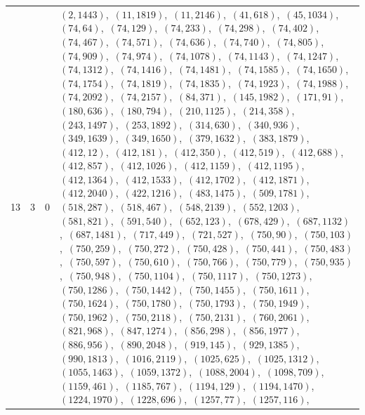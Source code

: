 \documentclass[11pt]{article}
\begin{document}
\begin{longtable}{@{}rrl>{\raggedright\arraybackslash}p{}@{}}
13 & 3 & $0$ & $(2,1443)$,\allowbreak\ $(11,1819)$,\allowbreak\ $(11,2146)$,\allowbreak\ $(41,618)$,\allowbreak\ $(45,1034)$,\allowbreak\ $(74,64)$,\allowbreak\ $(74,129)$,\allowbreak\ $(74,233)$,\allowbreak\ $(74,298)$,\allowbreak\ $(74,402)$,\allowbreak\ $(74,467)$,\allowbreak\ $(74,571)$,\allowbreak\ $(74,636)$,\allowbreak\ $(74,740)$,\allowbreak\ $(74,805)$,\allowbreak\ $(74,909)$,\allowbreak\ $(74,974)$,\allowbreak\ $(74,1078)$,\allowbreak\ $(74,1143)$,\allowbreak\ $(74,1247)$,\allowbreak\ $(74,1312)$,\allowbreak\ $(74,1416)$,\allowbreak\ $(74,1481)$,\allowbreak\ $(74,1585)$,\allowbreak\ $(74,1650)$,\allowbreak\ $(74,1754)$,\allowbreak\ $(74,1819)$,\allowbreak\ $(74,1835)$,\allowbreak\ $(74,1923)$,\allowbreak\ $(74,1988)$,\allowbreak\ $(74,2092)$,\allowbreak\ $(74,2157)$,\allowbreak\ $(84,371)$,\allowbreak\ $(145,1982)$,\allowbreak\ $(171,91)$,\allowbreak\ $(180,636)$,\allowbreak\ $(180,794)$,\allowbreak\ $(210,1125)$,\allowbreak\ $(214,358)$,\allowbreak\ $(243,1497)$,\allowbreak\ $(253,1892)$,\allowbreak\ $(314,630)$,\allowbreak\ $(340,936)$,\allowbreak\ $(349,1639)$,\allowbreak\ $(349,1650)$,\allowbreak\ $(379,1632)$,\allowbreak\ $(383,1879)$,\allowbreak\ $(412,12)$,\allowbreak\ $(412,181)$,\allowbreak\ $(412,350)$,\allowbreak\ $(412,519)$,\allowbreak\ $(412,688)$,\allowbreak\ $(412,857)$,\allowbreak\ $(412,1026)$,\allowbreak\ $(412,1159)$,\allowbreak\ $(412,1195)$,\allowbreak\ $(412,1364)$,\allowbreak\ $(412,1533)$,\allowbreak\ $(412,1702)$,\allowbreak\ $(412,1871)$,\allowbreak\ $(412,2040)$,\allowbreak\ $(422,1216)$,\allowbreak\ $(483,1475)$,\allowbreak\ $(509,1781)$,\allowbreak\ $(518,287)$,\allowbreak\ $(518,467)$,\allowbreak\ $(548,2139)$,\allowbreak\ $(552,1203)$,\allowbreak\ $(581,821)$,\allowbreak\ $(591,540)$,\allowbreak\ $(652,123)$,\allowbreak\ $(678,429)$,\allowbreak\ $(687,1132)$,\allowbreak\ $(687,1481)$,\allowbreak\ $(717,449)$,\allowbreak\ $(721,527)$,\allowbreak\ $(750,90)$,\allowbreak\ $(750,103)$,\allowbreak\ $(750,259)$,\allowbreak\ $(750,272)$,\allowbreak\ $(750,428)$,\allowbreak\ $(750,441)$,\allowbreak\ $(750,483)$,\allowbreak\ $(750,597)$,\allowbreak\ $(750,610)$,\allowbreak\ $(750,766)$,\allowbreak\ $(750,779)$,\allowbreak\ $(750,935)$,\allowbreak\ $(750,948)$,\allowbreak\ $(750,1104)$,\allowbreak\ $(750,1117)$,\allowbreak\ $(750,1273)$,\allowbreak\ $(750,1286)$,\allowbreak\ $(750,1442)$,\allowbreak\ $(750,1455)$,\allowbreak\ $(750,1611)$,\allowbreak\ $(750,1624)$,\allowbreak\ $(750,1780)$,\allowbreak\ $(750,1793)$,\allowbreak\ $(750,1949)$,\allowbreak\ $(750,1962)$,\allowbreak\ $(750,2118)$,\allowbreak\ $(750,2131)$,\allowbreak\ $(760,2061)$,\allowbreak\ $(821,968)$,\allowbreak\ $(847,1274)$,\allowbreak\ $(856,298)$,\allowbreak\ $(856,1977)$,\allowbreak\ $(886,956)$,\allowbreak\ $(890,2048)$,\allowbreak\ $(919,145)$,\allowbreak\ $(929,1385)$,\allowbreak\ $(990,1813)$,\allowbreak\ $(1016,2119)$,\allowbreak\ $(1025,625)$,\allowbreak\ $(1025,1312)$,\allowbreak\ $(1055,1463)$,\allowbreak\ $(1059,1372)$,\allowbreak\ $(1088,2004)$,\allowbreak\ $(1098,709)$,\allowbreak\ $(1159,461)$,\allowbreak\ $(1185,767)$,\allowbreak\ $(1194,129)$,\allowbreak\ $(1194,1470)$,\allowbreak\ $(1224,1970)$,\allowbreak\ $(1228,696)$,\allowbreak\ $(1257,77)$,\allowbreak\ $(1257,116)$,\allowbreak\ 
\end{longtable}
\end{document}

